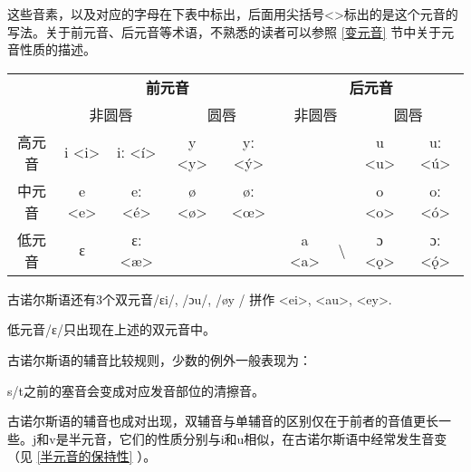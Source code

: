 
这些音素，以及对应的字母在下表中标出，后面用尖括号<>标出的是这个元音的写法。关于前元音、后元音等术语，不熟悉的读者可以参照 \ref{变元音} 节中关于元音性质的描述。

\begin{table}[H]
  \centering
  \begin{tabular}{@{}ccccccccc@{}}
    \toprule
        & \multicolumn{4}{c}{\textbf{前元音}} & \multicolumn{4}{c}{\textbf{后元音}}                                                                                                \\ \cmidrule(l){2-9}
        & \multicolumn{2}{c}{非圆唇}          & \multicolumn{2}{c}{圆唇}           & \multicolumn{2}{c}{非圆唇} & \multicolumn{2}{c}{圆唇}                                             \\ \cmidrule(l){2-9}
    高元音 & i <i>                            & iː <í>                           & y <y>                   & yː <ý>                 &       &                  & u <u> & uː <ú> \\
    中元音 & e <e>                            & eː <é>                           & ø <ø>                   & øː <œ>                 &       &                  & o <o> & oː <ó> \\
    低元音 & ɛ                                & ɛː <æ>                           &                         &                        & a <a> & \textbackslash{} & ɔ <ǫ> & ɔː <ǫ́> \\ \bottomrule
  \end{tabular}
\end{table}

古诺尔斯语还有3个双元音/ɛi/, /ɔu/, /øy / 拼作 <ei>, <au>, <ey>.

低元音/ɛ/只出现在上述的双元音中。

古诺尔斯语的辅音比较规则，少数的例外一般表现为：

\begin{info}
  s/t之前的塞音会变成对应发音部位的清擦音。\footnotemark
\end{info}

古诺尔斯语的辅音也成对出现，双辅音与单辅音的区别仅在于前者的音值更长一些。j和v是半元音，它们的性质分别与i和u相似，在古诺尔斯语中经常发生音变（见 \ref{半元音的保持性} ）。


